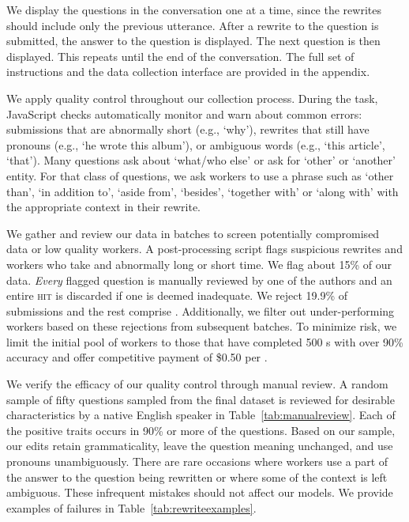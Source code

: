 We display the questions in the conversation one at a time, since the
rewrites should include only the previous utterance.  After a rewrite
to the question is submitted, the answer to the question is displayed.
The next question is then displayed.  This repeats until the end of
the conversation. The full set of instructions and the data collection
interface are provided in the appendix.

We apply quality control throughout our collection process. 
During the task, JavaScript checks automatically monitor and warn
about common errors: submissions that are abnormally short
(e.g., `why'), rewrites that still have pronouns (e.g., `he wrote this album'),
or ambiguous words (e.g., `this article', `that').
Many \abr{\quac} questions ask about `what/who else' or ask for
`other' or `another' entity. For that class of questions, we ask
workers to use a phrase such as `other than', `in addition to', `aside
from', `besides', `together with' or `along with' with the appropriate
context in their rewrite.

We gather and review our data in batches to
screen potentially compromised data or low quality workers.
A post-processing script flags suspicious rewrites and workers who take and abnormally long or short time.
We flag about 15\% of our data.
\textit{Every} flagged question is manually reviewed by one of the
authors and an entire \textsc{hit} is discarded if one is deemed
inadequate.
We reject 19.9\% of submissions and the rest comprise \name{}.
Additionally, we filter out under-performing workers based on these
rejections from subsequent batches.
To minimize risk, we limit the initial pool of workers to those that
have completed 500 s with over 90\% accuracy and offer competitive payment of \$0.50 per .

We verify the efficacy of our quality control through manual review.
A random sample of fifty questions sampled from the final dataset is reviewed for desirable characteristics by a native English speaker in Table~\ref{tab:manualreview}.  Each of the positive traits occurs in 90\% or more of the questions.  Based on our sample, our edits retain grammaticality, leave the
question meaning unchanged, and use pronouns unambiguously.  There are rare occasions where workers use a part of the answer to the question being rewritten or where some of the context is left ambiguous.  These infrequent mistakes should not affect our models.
We provide examples of failures in Table~\ref{tab:rewriteexamples}.



